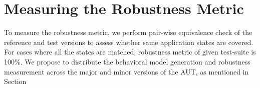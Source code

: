\section{Measuring the Robustness Metric}
\label{sec:MeasureRobMetric}
\vspace{-2mm} To measure the robustness metric, we perform pair-wise equivalence check of the reference and test versions to assess whether same application states are covered. For cases where all the states are matched, robustness metric of given test-suite is 100\%. We propose to distribute the behavioral model generation and robustness measurement across the major and minor versions of the AUT, as mentioned in Section